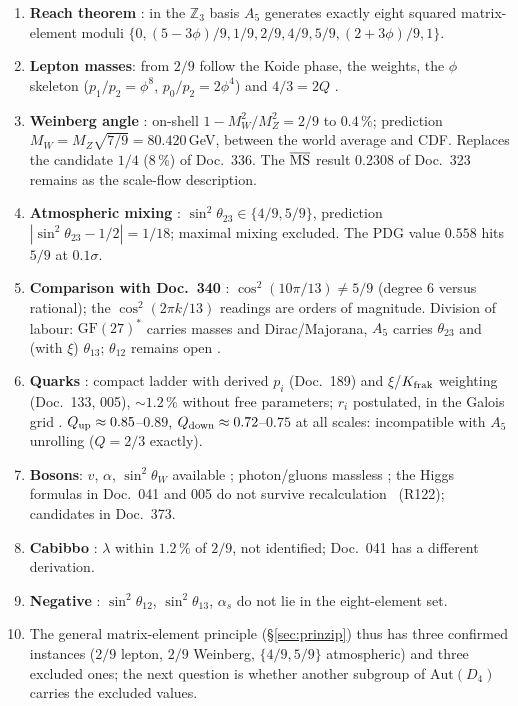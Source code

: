 \begin{enumerate}
\item \textbf{Reach theorem} \BM: in the $\mathbb Z_3$ basis $A_5$ generates
  exactly eight squared matrix-element moduli
  $\{0, (5-3\phi)/9, 1/9, 2/9, 4/9, 5/9, (2+3\phi)/9, 1\}$.
\item \textbf{Lepton masses}: from $2/9$ follow the Koide phase, the weights,
  the $\phi$ skeleton ($p_1/p_2 = \phi^8$, $p_0/p_2 = 2\phi^4$) and
  $4/3 = 2Q$ \BM.
\item \textbf{Weinberg angle} \KM: on-shell $1-M_W^2/M_Z^2 = 2/9$ to
  $0.4\,\%$; prediction $M_W = M_Z\sqrt{7/9} = 80.420$\,GeV, between the
  world average and CDF. Replaces the candidate $1/4$ (8\,\%) of Doc.~336.
  The $\overline{\rm MS}$ result 0.2308 of Doc.~323 remains as the scale-flow
  description.
\item \textbf{Atmospheric mixing} \KM: $\sin^2\theta_{23}\in\{4/9,5/9\}$,
  prediction $|\sin^2\theta_{23}-1/2| = 1/18$; maximal mixing excluded. The
  PDG value $0.558$ hits $5/9$ at $0.1\sigma$.
\item \textbf{Comparison with Doc.~340} \BM: $\cos^2(10\pi/13)\ne 5/9$
  (degree 6 versus rational); the $\cos^2(2\pi k/13)$ readings are orders of
  magnitude. Division of labour: $\mathrm{GF}(27)^*$ carries masses and
  Dirac/Majorana, $A_5$ carries $\theta_{23}$ and (with $\xi$) $\theta_{13}$;
  $\theta_{12}$ remains open \SM.
\item \textbf{Quarks} \XM: compact ladder with derived $p_i$ (Doc.~189) and
  $\xi$/$K_{\rm frak}$ weighting (Doc.~133, 005), $\sim1.2\,\%$ without free
  parameters; $r_i$ postulated, in the Galois grid \BM.
  $Q_{\rm up}\approx0.85$--$0.89$, $Q_{\rm down}\approx0.72$--$0.75$ at all
  scales: incompatible with $A_5$ unrolling ($Q = 2/3$ exactly).
\item \textbf{Bosons}: $v$, $\alpha$, $\sin^2\theta_W$ available \KM;
  photon/gluons massless \BM; the Higgs formulas in Doc.~041 and 005 do not
  survive recalculation \XM~(R122); candidates in Doc.~373.
\item \textbf{Cabibbo} \SM: $\lambda$ within $1.2\,\%$ of $2/9$, not
  identified; Doc.~041 has a different derivation.
\item \textbf{Negative} \XM: $\sin^2\theta_{12}$, $\sin^2\theta_{13}$,
  $\alpha_s$ do not lie in the eight-element set.
\item The general matrix-element principle (§\ref{sec:prinzip}) thus has
  three confirmed instances ($2/9$ lepton, $2/9$ Weinberg, $\{4/9,5/9\}$
  atmospheric) and three excluded ones; the next question is whether another
  subgroup of $\mathrm{Aut}(D_4)$ carries the excluded values.
\end{enumerate}

